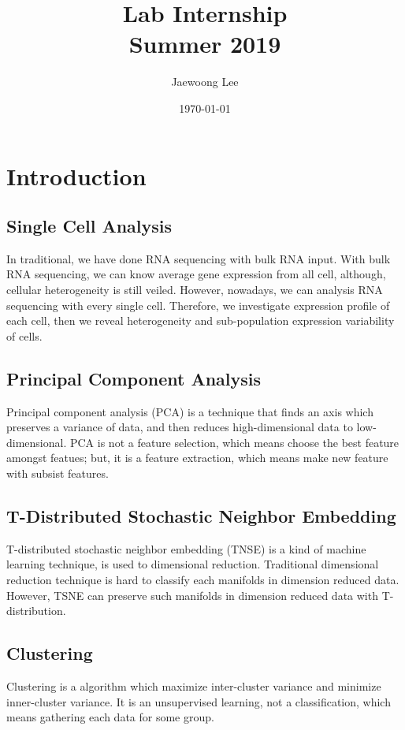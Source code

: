 \documentclass[aps, 10pt, a4paper]{article}
\title{Lab Internship\\Summer 2019}
\author{Jaewoong Lee}
\date{\today}
\begin{document}
    \maketitle
    \newpage
    
    \tableofcontents
    \listoftables
    \listoffigures
    \newpage
    
    \section{Introduction}
        \subsection{Single Cell Analysis}
            In traditional, we have done RNA sequencing with bulk RNA input. With bulk RNA sequencing, we can know average gene expression from all cell, although, cellular heterogeneity is still veiled. 
            However, nowadays, we can analysis RNA sequencing with every single cell. Therefore, we investigate expression profile of each cell, then we reveal heterogeneity and sub-population expression variability of cells.
        
        \subsection{Principal Component Analysis}
            Principal component analysis (PCA) is a technique that finds an axis which preserves a variance of data, and then reduces high-dimensional data to low-dimensional. PCA is not a feature selection, which means choose the best feature amongst featues; but, it is a feature extraction, which means make new feature with subsist features.
        
        \subsection{T-Distributed Stochastic Neighbor Embedding}
            T-distributed stochastic neighbor embedding (TNSE) is a kind of machine learning technique, is used to dimensional reduction. Traditional dimensional reduction technique is hard to classify each manifolds in dimension reduced data. However, TSNE can preserve such manifolds in dimension reduced data with T-distribution. 
        
        \subsection{Clustering}
            Clustering is a algorithm which maximize inter-cluster variance and minimize inner-cluster variance. It is an unsupervised learning, not a classification, which means gathering each data for some group.
    
\end{document}
